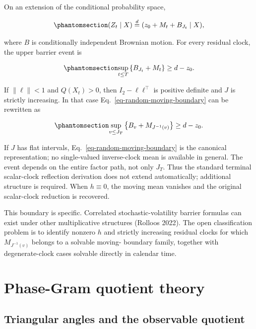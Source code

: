 \documentclass[
  english,
  11pt,
  letterpaper,
  DIV=11,
  numbers=noendperiod]{scrartcl}
\theoremstyle{plain}
\theoremstyle{plain}
\theoremstyle{plain}
\theoremstyle{plain}
\theoremstyle{remark}
\begin{document}
On an extension of the conditional probability space,

\begin{equation}\protect\phantomsection\label{eq-moving-boundary-representation}{
(Z_t\mid X)
\overset{d}{=}
(z_0+M_t+B_{J_t}\mid X),
}\end{equation}

where \(B\) is conditionally independent Brownian motion. For every
residual clock, the upper barrier event is

\begin{equation}\protect\phantomsection\label{eq-random-moving-boundary}{
\sup_{t\le T}
\left\{
B_{J_t}+M_t
\right\}
\ge d-z_0.
}\end{equation}

If \(\|\ell\|<1\) and \(Q(X_t)>0\), then \(I_2-\ell\ell^\top\) is
positive definite and \(J\) is strictly increasing. In that case
Eq.~\ref{eq-random-moving-boundary} can be rewritten as

\begin{equation}\protect\phantomsection\label{eq-strict-moving-boundary}{
\sup_{v\le J_T}
\left\{
B_v+M_{J^{-1}(v)}
\right\}
\ge d-z_0.
}\end{equation}

If \(J\) has flat intervals, Eq.~\ref{eq-random-moving-boundary} is the
canonical representation; no single-valued inverse-clock mean is
available in general. The event depends on the entire factor path, not
only \(J_T\). Thus the standard terminal scalar-clock reflection
derivation does not extend automatically; additional structure is
required. When \(h\equiv0\), the moving mean vanishes and the original
scalar-clock reduction is recovered.

This boundary is specific. Correlated stochastic-volatility barrier
formulas can exist under other multiplicative structures (Rolloos 2022).
The open classification problem is to identify nonzero \(h\) and
strictly increasing residual clocks for which \(M_{J^{-1}(v)}\) belongs
to a solvable moving- boundary family, together with degenerate-clock
cases solvable directly in calendar time.

\section{Phase-Gram quotient theory}\label{sec-phasegram}

\subsection{Triangular angles and the observable
quotient}\label{triangular-angles-and-the-observable-quotient}
\end{document}
